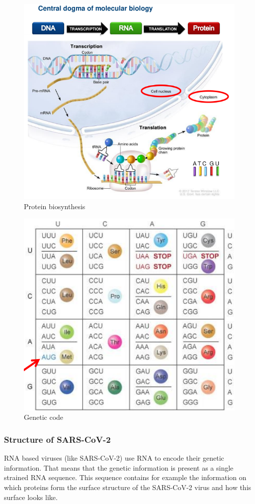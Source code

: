 \begin{figure}[ht!]
	\centering
	\includegraphics[width=0.9\linewidth]{figures/dogmaMolecularBiology.png}
	\caption{Protein biosynthesis \cite[p. 6]{schererStatisticalGeneticsGenetic2021}}
	\label{protein_biosynthesis}
\end{figure}

\begin{figure}[ht!]
	\centering
	\includegraphics[width=0.5\linewidth]{figures/geneticCode.png}
	\caption{Genetic code \cite[p. 10]{schererStatisticalGeneticsGenetic2021}}
	\label{genetic_code}
\end{figure}


\subsubsection{Structure of \ac{SARS-CoV-2}} \label{fundamentalsAc}

\ac{RNA} based viruses (like \ac{SARS-CoV-2}) use \ac{RNA} to encode their genetic information. That means that the genetic information is present as a single strained \ac{RNA} sequence. This sequence contains for example the information on which proteins form the surface structure of the SARS-CoV-2 virus and how this surface looks like. \cite{NAQVI2020165878}

